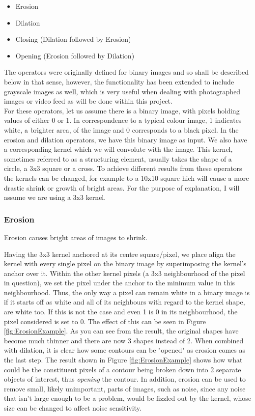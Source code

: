 \documentclass[11pt]{report}
\begin{document}
\begin{itemize}
	\item Erosion	
	\item Dilation
	\item Closing (Dilation followed by Erosion)
	\item Opening (Erosion followed by Dilation)
\end{itemize}

The operators were originally defined for binary images and so shall be 
described below in that sense, however, the functionality has been extended
to include grayscale images as well, which is very useful when dealing with
photographed images or video feed as will be done within this project.
\\
For these operators, let us assume there is a binary image, with pixels 
holding values of either 0 or 1. In correspondence to a typical colour image,
1 indicates white, a brighter area, of the image and 0 corresponds to a
black pixel. In the erosion and dilation operators, we have this binary
image as input. We also have a corresponding kernel which we will convolute
with the image. This kernel, sometimes referred to as a structuring element,
usually takes the shape of a circle, a 3x3 square or a cross. To achieve
different results from these operators the kernels can be changed, for example
to a 10x10 square hich will cause a more drastic shrink or growth of bright 
areas. For the purpose of explanation, I will assume we are using a 3x3 kernel.

\subsubsection*{Erosion}
\begin{center}
Erosion causes bright areas of images to shrink.
\end{center}

Having the 3x3 kernel anchored at its centre square/pixel, we place align
the kernel with every single pixel on the binary image by superimposing
the kernel's anchor over it. Within the other kernel pixels (a 3x3 neighbourhood
of the pixel in question), we set the pixel under the anchor to the minimum 
value in this neighbourhood. Thus, the only way a pixel can remain white in
a binary image is if it starts off as white and all of its neighbours with 
regard to the kernel shape, are white too. If this is not the case and even 1
is 0 in its neighbourhood, the pixel considered is set to 0. The effect
of this can be seen in Figure \ref{fig:ErosionExample}. As you can see from 
the result, the original shapes have become much thinner and there are now
3 shapes instead of 2. When combined with dilation, it is clear how some contours
can be "opened" as erosion comes as the last step. The result shown in
Figure \ref{fig:ErosionExample} shows how what could be the constituent pixels
of a contour being broken down into 2 separate objects of interest, thus 
\textit{opening} the contour. In addition, erosion can be used to remove
small, likely unimportant, parts of images, such as noise, since any noise
that isn't large enough to be a problem, would be fizzled out by the kernel, 
whose size can be changed to affect noise sensitivity.\\
\end{document}
